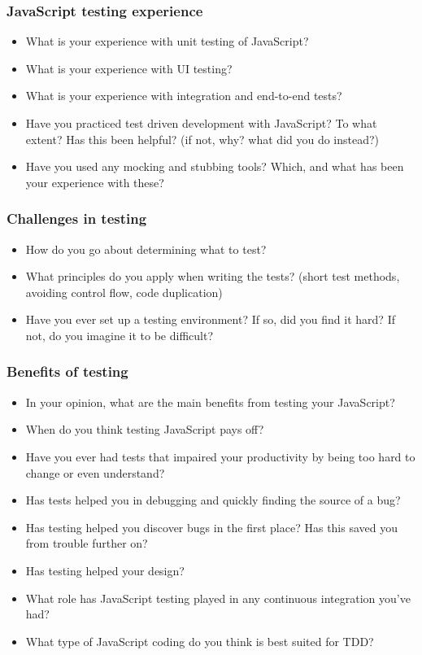 \documentclass[11pt]{article}
\begin{document}
\subsubsection{JavaScript testing experience}
\begin{itemize}
\item What is your experience with unit testing of JavaScript?
\item What is your experience with UI testing?
\item What is your experience with integration and end-to-end tests?
\item Have you practiced test driven development with JavaScript? To what extent? Has this been helpful? (if not, why? what did you do instead?)
\item Have you used any mocking and stubbing tools? Which, and what has been your experience with these?
\end{itemize}

\subsubsection{Challenges in testing}
\begin{itemize}
\item How do you go about determining what to test?
\item What principles do you apply when writing the tests? (short test methods, avoiding control flow, code duplication)
\item Have you ever set up a testing environment? If so, did you find it hard? If not, do you imagine it to be difficult?
\end{itemize}

\subsubsection{Benefits of testing}
\begin{itemize}
\item In your opinion, what are the main benefits from testing your JavaScript?
\item When do you think testing JavaScript pays off?
\item Have you ever had tests that impaired your productivity by being too hard to change or even understand?
\item Has tests helped you in debugging and quickly finding the source of a bug?
\item Has testing helped you discover bugs in the first place? Has this saved you from trouble further on?
\item Has testing helped your design?
\item What role has JavaScript testing played in any continuous integration you've had?
\item What type of JavaScript coding do you think is best suited for TDD?
\end{itemize}
\end{document}
